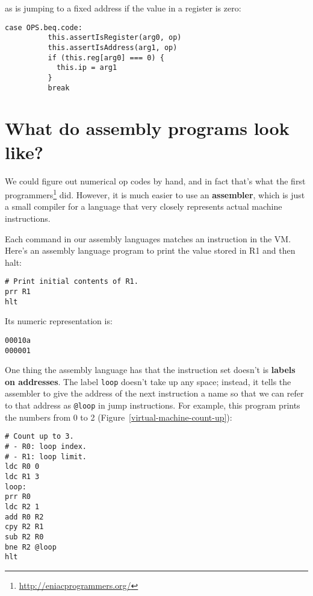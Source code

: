 \documentclass[krantzl]{krantz}
\newcommand{\figref}[1]{Figure~\ref{#1}}
\newcommand{\glossref}[1]{\textbf{#1}}
\newcommand{\hreffoot}[2]{{#1}\footnote{\href{#2}{#2}}}
\begin{document}
\noindent as is jumping to a fixed address if the value in a register is zero:


\begin{lstlisting}[frame=tblr]
        case OPS.beq.code:
          this.assertIsRegister(arg0, op)
          this.assertIsAddress(arg1, op)
          if (this.reg[arg0] === 0) {
            this.ip = arg1
          }
          break
\end{lstlisting}


\section{What do assembly programs look like?}\label{virtual-machine-assembly}


We could figure out numerical op codes by hand,
and in fact that’s what \hreffoot{the first programmers}{http://eniacprogrammers.org/} did.
However,
it is much easier to use an \glossref{assembler},
which is just a small compiler for a language that very closely represents actual machine instructions.


Each command in our assembly languages matches an instruction in the VM.
Here’s an assembly language program to print the value stored in R1 and then halt:


\begin{lstlisting}[frame=tblr]
# Print initial contents of R1.
prr R1
hlt
\end{lstlisting}



\noindent Its numeric representation is:


\begin{lstlisting}[frame=tblr]
00010a
000001
\end{lstlisting}



One thing the assembly language has that the instruction set doesn’t
is \glossref{labels on addresses}.
The label \texttt{loop} doesn’t take up any space;
instead,
it tells the assembler to give the address of the next instruction a name
so that we can refer to that address as \texttt{@loop} in jump instructions.
For example,
this program prints the numbers from 0 to 2
(\figref{virtual-machine-count-up}):


\begin{lstlisting}[frame=tblr]
# Count up to 3.
# - R0: loop index.
# - R1: loop limit.
ldc R0 0
ldc R1 3
loop:
prr R0
ldc R2 1
add R0 R2
cpy R2 R1
sub R2 R0
bne R2 @loop
hlt
\end{lstlisting}
\end{document}
